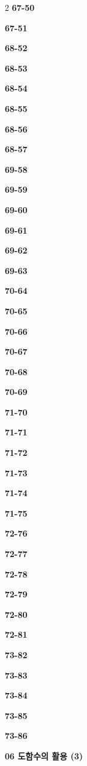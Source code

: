 \documentclass[10pt,a4paper]{article}
\begin{document}
\begin{multicols}{2}
\noindent\textbf{67-50}\ \par
\noindent\textbf{67-51}\ \par
\noindent\textbf{68-52}\ \par
\noindent\textbf{68-53}\ \par
\noindent\textbf{68-54}\ \par
\noindent\textbf{68-55}\ \par
\noindent\textbf{68-56}\ \par
\noindent\textbf{68-57}\ \par
\noindent\textbf{69-58}\ \par
\noindent\textbf{69-59}\ \par
\noindent\textbf{69-60}\ \par
\noindent\textbf{69-61}\ \par
\noindent\textbf{69-62}\ \par
\noindent\textbf{69-63}\ \par
\noindent\textbf{70-64}\ \par
\noindent\textbf{70-65}\ \par
\noindent\textbf{70-66}\ \par
\noindent\textbf{70-67}\ \par
\noindent\textbf{70-68}\ \par
\noindent\textbf{70-69}\ \par
\noindent\textbf{71-70}\ \par
\noindent\textbf{71-71}\ \par
\noindent\textbf{71-72}\ \par
\noindent\textbf{71-73}\ \par
\noindent\textbf{71-74}\ \par
\noindent\textbf{71-75}\ \par
\noindent\textbf{72-76}\ \par
\noindent\textbf{72-77}\ \par
\noindent\textbf{72-78}\ \par
\noindent\textbf{72-79}\ \par
\noindent\textbf{72-80}\ \par
\noindent\textbf{72-81}\ \par
\noindent\textbf{73-82}\ \par
\noindent\textbf{73-83}\ \par
\noindent\textbf{73-84}\ \par
\noindent\textbf{73-85}\ \par
\noindent\textbf{73-86}\ \par
\noindent\textbf{06 도함수의 활용 (3)}\par\smallskip

\end{multicols}
\end{document}

